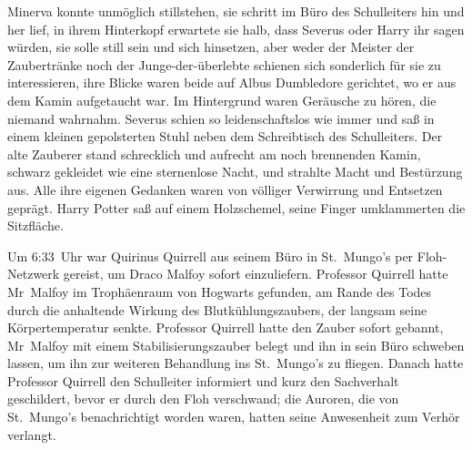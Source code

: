 Minerva konnte unmöglich stillstehen, sie schritt im Büro des Schulleiters hin und her lief, in ihrem Hinterkopf erwartete sie halb, dass Severus oder Harry ihr sagen würden, sie solle still sein und sich hinsetzen, aber weder der Meister der Zaubertränke noch der Junge-der-überlebte schienen sich sonderlich für sie zu interessieren, ihre Blicke waren beide auf Albus Dumbledore gerichtet, wo er aus dem Kamin aufgetaucht war. Im Hintergrund waren Geräusche zu hören, die niemand wahrnahm. Severus schien so leidenschaftslos wie immer und saß in einem kleinen gepolsterten Stuhl neben dem Schreibtisch des Schulleiters. Der alte Zauberer stand schrecklich und aufrecht am noch brennenden Kamin, schwarz gekleidet wie eine sternenlose Nacht, und strahlte Macht und Bestürzung aus. Alle ihre eigenen Gedanken waren von völliger Verwirrung und Entsetzen geprägt. Harry Potter saß auf einem Holzschemel, seine Finger umklammerten die Sitzfläche.

Um 6:33~Uhr war Quirinus Quirrell aus seinem Büro in St.~Mungo’s per Floh-Netzwerk gereist, um Draco Malfoy sofort einzuliefern. Professor Quirrell hatte Mr~Malfoy im Trophäenraum von Hogwarts gefunden, am Rande des Todes durch die anhaltende Wirkung des Blutkühlungszaubers, der langsam seine Körpertemperatur senkte. Professor Quirrell hatte den Zauber sofort gebannt, Mr~Malfoy mit einem Stabilisierungszauber belegt und ihn in sein Büro schweben lassen, um ihn zur weiteren Behandlung ins St.~Mungo’s zu fliegen. Danach hatte Professor Quirrell den Schulleiter informiert und kurz den Sachverhalt geschildert, bevor er durch den Floh verschwand; die Auroren, die von St.~Mungo’s benachrichtigt worden waren, hatten seine Anwesenheit zum Verhör verlangt.

